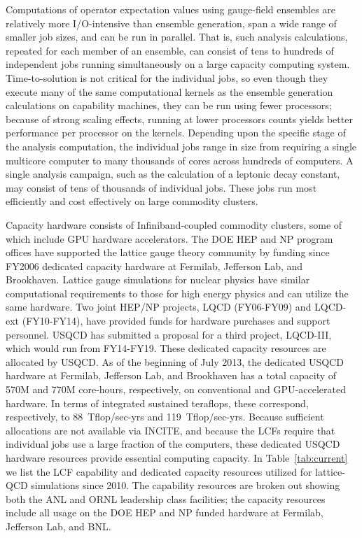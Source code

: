 Computations of operator expectation values using gauge-field ensembles are
relatively more I/O-intensive than ensemble generation, span a wide range of
smaller job sizes, and can be run in parallel.  That is, such analysis
calculations, repeated for each member of an ensemble, can consist of tens to
hundreds of independent jobs running simultaneously on a large capacity
computing system.  Time-to-solution is not critical for the individual jobs,
so even though they execute many of the same computational kernels as the
ensemble generation calculations on capability machines, they can be run using
fewer processors; because of strong scaling effects, running at lower
processors counts yields better performance per processor on the kernels.
Depending upon the specific stage of the analysis computation, the individual
jobs range in size from requiring a single multicore computer to many
thousands of cores across hundreds of computers.  A single analysis campaign,
such as the calculation of a leptonic decay constant, may consist of tens of
thousands of individual jobs.  These jobs run most efficiently and cost
effectively on large commodity clusters.

Capacity hardware consists of Infiniband-coupled commodity clusters, some of
which include GPU hardware
accelerators.  The DOE HEP and NP program offices have supported the lattice
gauge theory community by funding since FY2006 dedicated capacity hardware at
Fermilab, Jefferson Lab, and Brookhaven.  Lattice gauge simulations for
nuclear physics have similar computational requirements to those for high
energy physics and can utilize the same hardware.  Two joint HEP/NP projects,
LQCD (FY06-FY09) and LQCD-ext (FY10-FY14), have provided funds for hardware
purchases and support personnel.  USQCD has submitted a proposal for a third
project, LQCD-III, which would run from FY14-FY19.  These dedicated capacity
resources are allocated by USQCD.  As of the beginning of July 2013, the
dedicated USQCD hardware at Fermilab, Jefferson Lab, and Brookhaven has a
total capacity of 570M and 770M core-hours, respectively, on conventional and
GPU-accelerated hardware.  In terms of integrated sustained teraflops, these
correspond, respectively, to 88~Tflop/sec-yrs and 119~Tflop/sec-yrs.
Because sufficient allocations are not available via INCITE, and because the
LCFs require that individual jobs use a large fraction of the computers, these
dedicated USQCD hardware resources provide essential computing capacity.  In
Table~\ref{tab:current} we list the LCF capability and dedicated capacity
resources utilized for lattice-QCD simulations since 2010.  The capability
resources are broken out showing both the ANL and ORNL leadership class
facilities; the capacity resources include all usage on the DOE HEP and NP
funded hardware at Fermilab, Jefferson Lab, and BNL.

